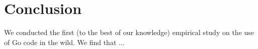 \section{Conclusion}
\label{sec:concl}

We conducted the first (to the best of our knowledge) empirical study on the use of \unsafe{} Go code in the wild.
We find that ...